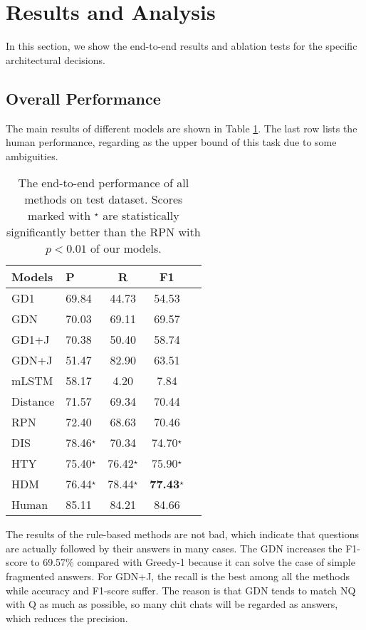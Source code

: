 \section{Results and Analysis}
\label{sec:results}
In this section, we show the end-to-end results and ablation tests for the specific architectural decisions.
\subsection{Overall Performance}
The main results of different models are shown in Table \ref{tab:mainResults}. The last row lists the human performance, regarding as the upper bound of this task due to some ambiguities. 

\begin{table}[th]
	\scriptsize
	\centering
	\begin{tabular}{p{1cm}<{\centering}p{1cm}<{\centering}ccc}
		\toprule[1.5pt]
		Models &P&R& F1\\
		\midrule[1pt]
		GD1&69.84&44.73&54.53\\
		GDN  &70.03&69.11&69.57\\
		GD1+J&70.38&50.40&58.74\\
		GDN+J&51.47&82.90&63.51\\
		\hline
		mLSTM&58.17&4.20&7.84\\
		Distance&71.57&69.34&70.44\\
		RPN&72.40&68.63&70.46\\
\hline
		DIS&78.46$^\star$&70.34&74.70$^\star$\\
		HTY&75.40$^\star$&76.42$^\star$&75.90$^\star$\\
		HDM&76.44$^\star$&78.44$^\star$&\textbf{77.43}$^\star$\\
		\hline
		Human &85.11&84.21&84.66\\
		\bottomrule[1.5pt]
	\end{tabular}
	\vspace{-0.25cm}
	\caption{The end-to-end performance of all methods on test dataset. Scores marked with $^\star$ are statistically significantly better than the RPN with $p<0.01$ of our models.}
	\label{tab:mainResults}
\end{table}

 

The results of the rule-based methods are not bad, which indicate that questions are actually followed by their answers in many cases. The GDN increases the F1-score to 69.57\% compared with Greedy-1 because it can solve the case of simple fragmented answers. For GDN+J, the recall is the best among all the methods while accuracy and F1-score suffer. 
The reason is that GDN tends to match NQ with Q as much as possible, so many chit chats will be regarded as answers, which reduces the precision.

